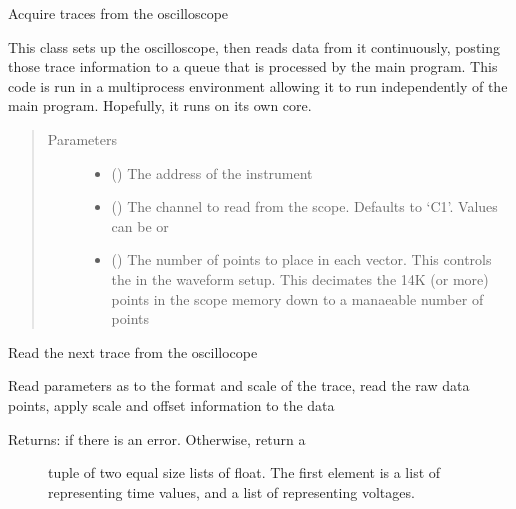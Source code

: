 \documentclass[letterpaper,10pt,english]{sphinxmanual}
\begin{document}
\begin{fulllineitems}
\label{\detokenize{index:background.Acquire}}
Acquire traces from the oscilloscope

This class sets up the oscilloscope, then reads data from it
continuously, posting those trace information to a queue that is
processed by the main program.  This code is run in a multiprocess
environment allowing it to run independently of the main program.
Hopefully, it runs on its own core.
\begin{quote}\begin{description}
\item[{Parameters}] \leavevmode\begin{itemize}
\item {} 
 () \textendash{} The  address of the instrument

\item {} 
 () \textendash{} The channel to read from the scope.  Defaults
to ‘C1’.  Values can be  or 

\item {} 
 () \textendash{} The number of points to place in each vector.
This controls the  in the waveform
setup. This decimates the 14K (or more) points in
the scope memory down to a manaeable number of
points

\end{itemize}

\end{description}\end{quote}

\begin{fulllineitems}
\label{\detokenize{index:background.Acquire.update}}
Read the next trace from the oscillocope

Read parameters as to the format and scale of the trace, read
the raw data points, apply scale and offset information to
the data
\begin{description}
\item[{Returns:  if there is an error.  Otherwise, return a}] \leavevmode
tuple of two equal size lists of float.  The first
element is a list of  representing time
values, and a list of  representing voltages.


\end{description}
\end{fulllineitems}
\end{fulllineitems}
\end{document}
